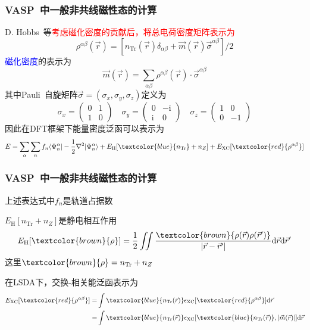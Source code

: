 {\frame
{
	\frametitle{\textrm{VASP~}中一般非共线磁性态的计算}
	\textrm{D. Hobbs~}等\textcolor{red}{考虑磁化密度的贡献后，将总电荷密度矩阵表示为}
	\begin{displaymath}
		\rho^{\alpha\beta}(\vec r)=\left[n_{\mathrm{Tr}}(\vec r)\delta_{\alpha\beta}+\vec m(\vec r)\vec{\sigma}^{\alpha\beta}\right]/2
	\end{displaymath}
	\textcolor{blue}{磁化密度}的表示为
	\begin{displaymath}
		\vec m(\vec r)=\sum_{\alpha\beta}\rho^{\alpha\beta}(\vec r)\cdot\vec{\sigma}^{\alpha\beta}
	\end{displaymath}
	其中\textrm{Pauli~}自旋矩阵$\vec{\sigma}=(\sigma_x,\sigma_y,\sigma_z)$定义为
	\begin{displaymath}
		\sigma_x=\left( 
		\begin{matrix}
			0 &1\\
			1 &0
		\end{matrix}
		\right)\quad
		\sigma_y=\left( 
		\begin{matrix}
			0 &-\mathrm{i}\\
			\mathrm{i} &0
		\end{matrix}
		\right)\quad
		\sigma_z=\left( 
		\begin{matrix}
			1 &0\\
			0 &-1
		\end{matrix}
		\right)
	\end{displaymath}
	因此在\textrm{DFT}框架下能量密度泛函可以表示为
	\begin{displaymath}
		E=\sum_{\alpha}\sum_{n}f_n\langle\Psi_n^{\alpha}|-\frac12\nabla^2|\Psi_n^{\alpha}\rangle+E_{\mathrm{H}}[\textcolor{blue}{n_{\mathrm{Tr}}}+n_Z]+E_{\mathrm{XC}}[\textcolor{red}{\rho^{\alpha\beta}}]
	\end{displaymath}
}

\frame
{
	\frametitle{\textrm{VASP~}中一般非共线磁性态的计算}
	上述表达式中$f_n$是轨道占据数
	
	$E_{\mathrm{H}}[n_{\mathrm{Tr}}+n_Z]$是静电相互作用
	\begin{displaymath}
		E_{\mathrm{H}}[\textcolor{brown}{\rho}]=\frac12\iint\frac{\textcolor{brown}{\rho(\vec r)\rho(\vec r^{\prime})}}{|\vec r-\vec r^{\prime}|}\mathrm{d}\vec r\mathrm{d}\vec r^{\prime}
	\end{displaymath}
	这里$\textcolor{brown}{\rho}=n_{\mathrm{Tr}}+n_Z$

	在\textrm{LSDA}下，交换-相关能泛函表示为
	\begin{displaymath}
		\begin{aligned}
			E_{\mathrm{XC}}[\textcolor{red}{\rho^{\alpha\beta}}]=&\int\textcolor{blue}{n_{\mathrm{Tr}}(\vec r)}\epsilon_{\mathrm{XC}}[\textcolor{red}{\rho^{\alpha\beta}}]\mathrm{d}\vec r\\
			=&\int\textcolor{blue}{n_{\mathrm{Tr}}(\vec r)}\epsilon_{\mathrm{XC}}[\textcolor{blue}{n_{\mathrm{Tr}}(\vec r)},|\vec m(\vec r)|]\mathrm{d}\vec r
		\end{aligned}
	\end{displaymath}
}

}
